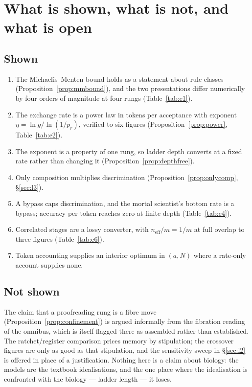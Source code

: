 \documentclass[11pt]{article}
\theoremstyle{plain}
\theoremstyle{definition}
\theoremstyle{remark}
\begin{document}
\section{What is shown, what is not, and what is open}

\subsection{Shown}

\begin{enumerate}[leftmargin=*,label=(\arabic*)]
\item The Michaelis--Menten bound holds as a statement about rule classes
  (Proposition~\ref{prop:mmbound}), and the two presentations differ
  numerically by four orders of magnitude at four rungs (Table~\ref{tab:e1}).
\item The exchange rate is a power law in tokens per acceptance with exponent
  $\eta = \ln g/\ln(1/p_r)$, verified to six figures
  (Proposition~\ref{prop:power}, Table~\ref{tab:e2}).
\item The exponent is a property of one rung, so ladder depth converts at a
  fixed rate rather than changing it (Proposition~\ref{prop:depthfree}).
\item Only composition multiplies discrimination
  (Proposition~\ref{prop:onlycomp}, \S\ref{sec:l3}).
\item A bypass caps discrimination, and the mortal scientist's bottom rate is
  a bypass; accuracy per token reaches zero at finite depth
  (Table~\ref{tab:e4}).
\item Correlated stages are a lossy converter, with $n_{\mathrm{eff}}/m = 1/m$
  at full overlap to three figures (Table~\ref{tab:e6}).
\item Token accounting supplies an interior optimum in $(a, N)$ where a
  rate-only account supplies none.
\end{enumerate}

\subsection{Not shown}

The claim that a proofreading rung is a fibre move
(Proposition~\ref{prop:confinement}) is argued informally from the fibration
reading of the omnibus, which is itself flagged there as assembled rather than
established. The ratchet/register comparison prices memory by stipulation; the
crossover figures are only as good as that stipulation, and the sensitivity
sweep in \S\ref{sec:l2} is offered in place of a justification. Nothing here
is a claim about biology: the models are the textbook idealisations, and the
one place where the idealisation is confronted with the biology --- ladder
length --- it loses.
\end{document}
